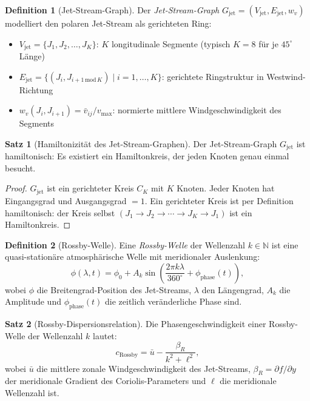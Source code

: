 ﻿\documentclass[a4paper,12pt]{article}
\theoremstyle{definition}
\newtheorem{definition}{Definition}
\newtheorem{satz}{Satz}
\begin{document}
\begin{definition}[Jet-Stream-Graph]
Der \emph{Jet-Stream-Graph} $G_{\mathrm{jet}} = (V_{\mathrm{jet}}, E_{\mathrm{jet}}, w_v)$
modelliert den polaren Jet-Stream als gerichteten Ring:
\begin{itemize}
    \item $V_{\mathrm{jet}} = \{J_1, J_2, \ldots, J_K\}$: $K$ longitudinale Segmente
          (typisch $K = 8$ f\"ur je $45^\circ$ L\"ange)
    \item $E_{\mathrm{jet}} = \{(J_i, J_{i+1\,\mathrm{mod}\,K}) \mid i = 1,\ldots,K\}$:
          gerichtete Ringstruktur in Westwind-Richtung
    \item $w_v(J_i, J_{i+1}) = \bar{v}_{ij}/v_{\max}$: normierte mittlere
          Windgeschwindigkeit des Segments
\end{itemize}
\end{definition}

\begin{satz}[Hamiltonizit\"at des Jet-Stream-Graphen]
\label{satz:hamilton_jet}
Der Jet-Stream-Graph $G_{\mathrm{jet}}$ ist hamiltonisch: Es existiert ein
Hamiltonkreis, der jeden Knoten genau einmal besucht.
\end{satz}

\begin{proof}
$G_{\mathrm{jet}}$ ist ein gerichteter Kreis $C_K$ mit $K$ Knoten. Jeder Knoten hat
Eingangsgrad und Ausgangsgrad $= 1$. Ein gerichteter Kreis ist per Definition hamiltonisch:
der Kreis selbst $(J_1 \to J_2 \to \cdots \to J_K \to J_1)$ ist ein Hamiltonkreis.
\end{proof}

\begin{definition}[Rossby-Welle]
Eine \emph{Rossby-Welle} der Wellenzahl $k \in \mathbb{N}$ ist eine quasi-station\"are
atmosph\"arische Welle mit meridionaler Auslenkung:
\[
\phi(\lambda, t) = \phi_0 + A_k \sin\!\left(\frac{2\pi k \lambda}{360^\circ} + \phi_{\mathrm{phase}}(t)\right),
\]
wobei $\phi$ die Breitengrad-Position des Jet-Streams, $\lambda$ den L\"angengrad,
$A_k$ die Amplitude und $\phi_{\mathrm{phase}}(t)$ die zeitlich ver\"anderliche Phase sind.
\end{definition}

\begin{satz}[Rossby-Dispersionsrelation]
\label{satz:rossby}
Die Phasengeschwindigkeit einer Rossby-Welle der Wellenzahl $k$ lautet:
\[
c_{\mathrm{Rossby}} = \bar{u} - \frac{\beta_R}{k^2 + \ell^2},
\]
wobei $\bar{u}$ die mittlere zonale Windgeschwindigkeit des Jet-Streams,
$\beta_R = \partial f / \partial y$ der meridionale Gradient des Coriolis-Parameters
und $\ell$ die meridionale Wellenzahl ist.
\end{satz}
\end{document}
